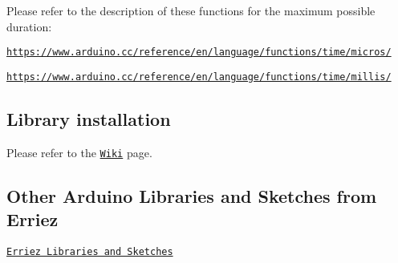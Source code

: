 Please refer to the description of these functions for the maximum possible duration\+:


\begin{DoxyItemize}
\item \href{https://www.arduino.cc/reference/en/language/functions/time/micros/}{\tt https\+://www.\+arduino.\+cc/reference/en/language/functions/time/micros/}
\item \href{https://www.arduino.cc/reference/en/language/functions/time/millis/}{\tt https\+://www.\+arduino.\+cc/reference/en/language/functions/time/millis/}
\end{DoxyItemize}

\subsection*{Library installation}

Please refer to the \href{https://github.com/Erriez/ErriezArduinoLibrariesAndSketches/wiki}{\tt Wiki} page.

\subsection*{Other Arduino Libraries and Sketches from Erriez}


\begin{DoxyItemize}
\item \href{https://github.com/Erriez/ErriezArduinoLibrariesAndSketches}{\tt Erriez Libraries and Sketches} 
\end{DoxyItemize}